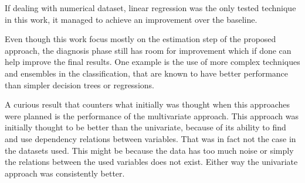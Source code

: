   If dealing with numerical dataset, linear regression was the only tested technique in this work, it managed to achieve an improvement 
  over the baseline.
  
  Even though this work focus mostly on the estimation step of the proposed approach, the diagnosis phase still has room for improvement which if done can help improve the final results. One example is the use of more complex techniques and ensembles in the classification, that are known to have better performance than simpler decision trees or regressions.
  
  A curious result that counters what initially was thought when this approaches were planned is the performance of the multivariate approach. This approach was initially thought to be better than the univariate, because of its ability to find and use dependency relations between variables. That was in fact not the case in the datasets used. This might be because the data has too much noise or simply the relations between the used variables does not exist. Either way the univariate approach was consistently better.
 
 
\cleardoublepage
